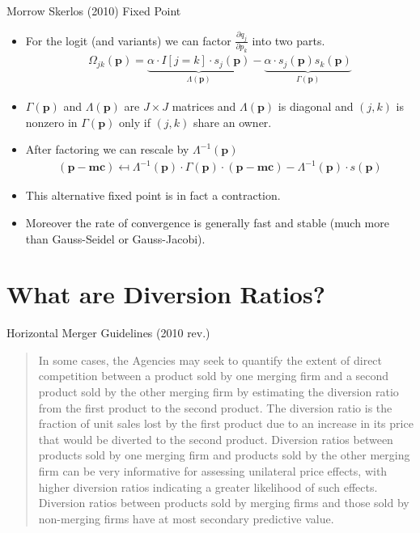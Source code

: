 \documentclass[xcolor=pdftex,dvipsnames,table,mathserif]{beamer}
\begin{document}
\begin{frame}{Morrow Skerlos (2010) Fixed Point}
\begin{itemize}
\item For the logit (and variants) we can factor $\frac{\partial q_j}{\partial p_k}$ into two parts. 
\begin{eqnarray*}
\Omega_{jk}(\mathbf{p}) =  \underbrace{\alpha \cdot I[j=k] \cdot s_j(\mathbf{p})}_{\Lambda(\mathbf{p})} -  \underbrace{\alpha \cdot s_{j}(\mathbf{p}) s_{k}(\mathbf{p})}_{\Gamma(\mathbf{p})}
\end{eqnarray*}
\item $\Gamma(\mathbf{p})$ and $\Lambda(\mathbf{p})$ are $J \times J$ matrices and $\Lambda(\mathbf{p})$ is diagonal and $(j,k)$ is nonzero in $\Gamma(\mathbf{p})$ only if $(j,k)$ share an owner.
\item After factoring we can rescale by $\Lambda^{-1} (\mathbf{p})$
\begin{eqnarray*}
(\mathbf{p}-\mathbf{mc} ) \mapsfrom \Lambda^{-1}(\mathbf{p}) \cdot \Gamma(\mathbf{p})\cdot(\mathbf{p}- \mathbf{mc}) - \Lambda^{-1}(\mathbf{p})\cdot s(\mathbf{p})
\end{eqnarray*}
\item This alternative fixed point is in fact a contraction.
\item Moreover the rate of convergence is generally fast and stable (much more than Gauss-Seidel or Gauss-Jacobi).
\end{itemize}
\end{frame}



\section{What are Diversion Ratios?} 


\begin{frame}{Horizontal Merger Guidelines (2010 rev.)}
\begin{quote}
In some cases, the Agencies may seek to quantify the extent of direct competition between a product sold by one merging firm and a second product sold by the other merging firm by estimating the diversion ratio from the first product to the second product. The diversion ratio is the \alert{fraction of unit sales lost by the first product due to an increase in its price that would be diverted to the second product}. Diversion ratios between products sold by one merging firm and products sold by the other merging firm can be very informative for assessing unilateral price effects, with \alert{higher diversion ratios indicating a greater likelihood of such effects}. Diversion ratios between products sold by merging firms and those sold by \alert{non-merging firms have at most secondary predictive value.}
\end{quote}
\end{frame}
\end{document}
